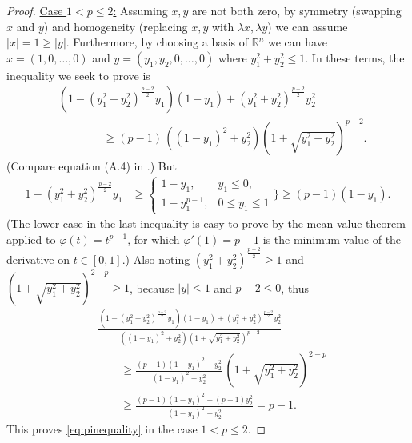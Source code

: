 \documentclass[final,leqno,onefignum,onetabnum]{siamltex1213bueler}
\newcommand\RR{\mathbb{R}}
\begin{document}
\begin{proof}
\medskip
\noindent \underline{Case $1 < p \le 2$:}  Assuming $x,y$ are not both zero, by symmetry (swapping $x$ and $y$) and homogeneity (replacing $x,y$ with $\lambda x,\lambda y$) we can assume $|x| = 1 \ge |y|$.  Furthermore, by choosing a basis of $\RR^n$ we can have $x=(1,0,\dots,0)$ and $y=(y_1,y_2,0,\dots,0)$ where $y_1^2+y_2^2 \le 1$.  In these terms, the inequality we seek to prove is
\begin{align*}
&\left(1 - (y_1^2+y_2^2)^{\frac{p-2}{2}} y_1\right) (1-y_1) + (y_1^2+y_2^2)^{\frac{p-2}{2}} y_2^2 \\
&\qquad\qquad \ge (p-1)\, \left((1-y_1)^2+y_2^2\right) \left(1 + \sqrt{y_1^2+y_2^2} \right)^{p-2}.
\end{align*}
(Compare equation (A.4) in \cite{Peral1997}.)  But
\begin{align*}
1 - (y_1^2+y_2^2)^{\frac{p-2}{2}} y_1
      &\ge \begin{cases} 1-y_1, & y_1 \le 0, \\
                        1-y_1^{p-1}, & 0 \le y_1 \le 1 \end{cases}\Bigg\}
      \ge (p-1) (1-y_1).
\end{align*}
(The lower case in the last inequality is easy to prove by the mean-value-theorem applied to $\varphi(t)=t^{p-1}$, for which $\varphi'(1)=p-1$ is the minimum value of the derivative on $t\in[0,1]$.)  Also noting $(y_1^2+y_2^2)^{\frac{p-2}{2}} \ge 1$ and $\left(1 + \sqrt{y_1^2+y_2^2} \right)^{2-p} \ge 1$, because $|y|\le 1$ and $p-2\le 0$, thus
\begin{align*}
&\frac{\left(1 - (y_1^2+y_2^2)^{\frac{p-2}{2}} y_1\right) (1-y_1) + (y_1^2+y_2^2)^{\frac{p-2}{2}} y_2^2}
      {\left((1-y_1)^2+y_2^2\right) \left(1 + \sqrt{y_1^2+y_2^2} \right)^{p-2}} \\
&\qquad \ge \frac{(p-1) (1-y_1)^2 + y_2^2}
      {(1-y_1)^2+y_2^2} \,  \left(1 + \sqrt{y_1^2+y_2^2} \right)^{2-p} \\
&\qquad \ge \frac{(p-1) (1-y_1)^2 + (p-1) y_2^2}{(1-y_1)^2+y_2^2} = p-1.
\end{align*}
This proves \eqref{eq:pinequality} in the case $1<p\le 2$.
\end{proof}
\end{document}
